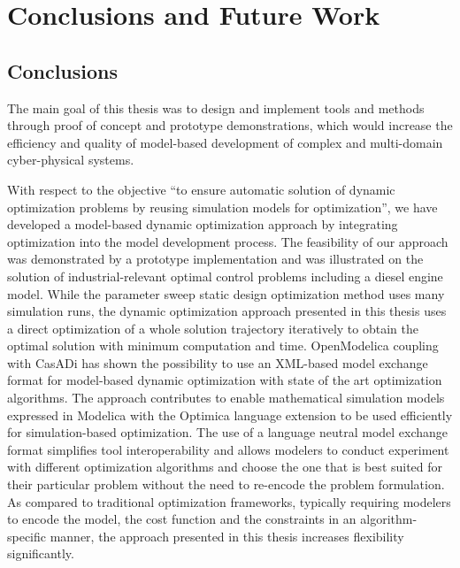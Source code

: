 
\chapter{Conclusions and Future Work}
\label{cha:conclusionsandfuturework}

\section{Conclusions}
\label{sec:conclusions}

The main goal of this thesis was to design and implement tools and methods through proof of concept and prototype demonstrations, which would increase the efficiency and quality of model-based development of complex and multi-domain cyber-physical systems.

With respect to the objective “to ensure automatic solution of dynamic optimization problems by reusing simulation models for optimization”, we have developed a model-based dynamic optimization approach by integrating optimization into the model development process. The feasibility of our approach was demonstrated by a prototype implementation and was illustrated on the solution of industrial-relevant optimal control problems including a diesel engine model. While the parameter sweep static design optimization method uses many simulation runs, the dynamic optimization approach presented in this thesis uses a direct optimization of a whole solution trajectory iteratively to obtain the optimal solution with minimum computation and time. OpenModelica coupling with CasADi has shown the possibility to use an XML-based model exchange format for model-based dynamic optimization with state of the art optimization algorithms. The approach contributes to enable mathematical simulation models expressed in Modelica with the  Optimica language extension to be used efficiently for simulation-based optimization. The use of a language neutral model exchange format simplifies tool interoperability and allows modelers to conduct experiment with different optimization algorithms and choose the one that is best suited for their particular problem without the need to re-encode the problem formulation. As compared to traditional optimization frameworks, typically requiring modelers to encode the model, the cost function and the constraints in an algorithm-specific manner, the approach presented in this thesis increases flexibility significantly.    

